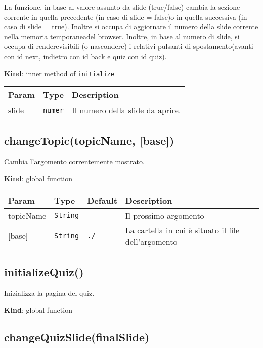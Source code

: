 La funzione, in base al valore assunto da slide (true/false) cambia la
sezione corrente in quella precedente (in caso di slide = false)o in
quella successiva (in caso di slide = true). Inoltre si occupa di
aggiornare il numero della slide corrente nella memoria temporaneadel
browser. Inoltre, in base al numero di slide, si occupa di
renderevisibili (o nascondere) i relativi pulsanti di spostamento(avanti
con id next, indietro con id back e quiz con id quiz).

\textbf{Kind}: inner method of
\protect\hyperlink{initialize}{\texttt{initialize}}

\begin{tabularx}{\textwidth}{XXX}
\toprule
Param & Type & Description\tabularnewline
\midrule
\endhead
slide & \texttt{numer} & Il numero della slide da aprire.\tabularnewline
\bottomrule
\end{tabularx}

\protect\hypertarget{changeTopic}{}{}

\hypertarget{changetopictopicname-base}{%
\subsection{changeTopic(topicName,
{[}base{]})}\label{changetopictopicname-base}}

Cambia l'argomento correntemente mostrato.

\textbf{Kind}: global function

\begin{tabularx}{\textwidth}{XXXX}
\toprule
Param & Type & Default & Description\tabularnewline
\midrule
\endhead
topicName & \texttt{String} & & Il prossimo argomento\tabularnewline
{[}base{]} & \texttt{String} & \texttt{./} & La cartella in cui è
situato il file dell'argomento\tabularnewline
\bottomrule
\end{tabularx}

\protect\hypertarget{initializeQuiz}{}{}

\hypertarget{initializequiz}{%
\subsection{initializeQuiz()}\label{initializequiz}}

Inizializza la pagina del quiz.

\textbf{Kind}: global function\\
\protect\hypertarget{changeQuizSlide}{}{}

\hypertarget{changequizslidefinalslide}{%
\subsection{changeQuizSlide(finalSlide)}\label{changequizslidefinalslide}}

